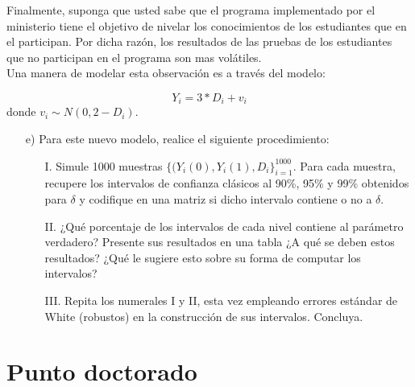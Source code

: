\documentclass[a4paper]{article}
\begin{document}
    

 Finalmente, suponga que usted sabe que el programa implementado por el ministerio tiene el objetivo de nivelar los conocimientos de los estudiantes que en el participan. Por dicha razón, los resultados de las pruebas de los estudiantes que no participan en el programa son mas volátiles.\\
    
    Una manera de modelar esta observación es a través del modelo:
    
    \begin{equation*}
        Y_{i} = 3*D_{i}+v_{i}
    \end{equation*}
    donde $v_{i}\sim N(0, 2-D_{i})$.
    
    
   
\begin{itemize}  
    
\item[e)] Para este nuevo modelo, realice el siguiente procedimiento:     
    
    
    \begin{itemize}
        \item[I.] Simule 1000 muestras $\{(Y_{i}(0), Y_i(1), D_i\}_{i=1}^{1000}$. Para cada muestra, recupere los intervalos de confianza clásicos al 90\%, 95\% y 99\% obtenidos para $\delta$ y codifique en una matriz si dicho intervalo contiene o no a $\delta$.
        
        \item[II.]¿Qué porcentaje de los intervalos de cada nivel contiene al parámetro verdadero? Presente sus resultados en una tabla ¿A qué se deben estos resultados? ¿Qué le sugiere esto sobre su forma de computar los intervalos?
 
        \item[III.] Repita los numerales I y II, esta vez empleando errores estándar de White (robustos) en la construcción de sus intervalos. Concluya.
        
\end{itemize}
\end{itemize}



\bigskip


\section*{Punto doctorado}
\end{document}
